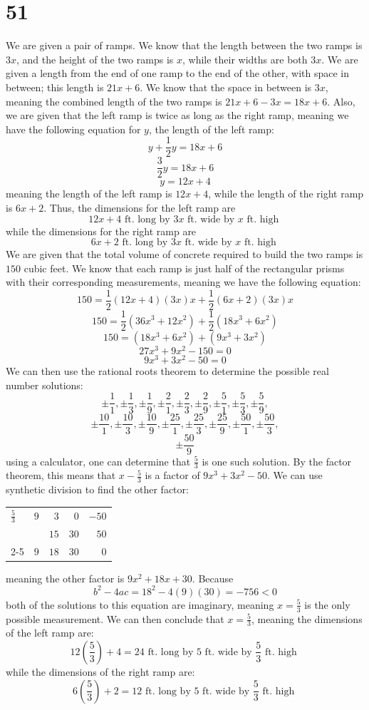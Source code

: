 \documentclass{article}
\theoremstyle{definition}
\begin{document}
\section*{51}
We are given a pair of ramps. We know that the length between the two ramps is $3x$, and the height of the two ramps is $x$, while 
their widths are both $3x$. We are given a length from the end of one ramp to the end of the other, with space in between; this 
length is $21x+6$. We know that 
the space in between is $3x$, meaning the combined length of the two ramps is $21x+6-3x=18x+6$. Also, we are given that the left ramp 
is twice as long as the right ramp, meaning we have the following equation for $y$, the length of the left ramp:
\[ y+\frac{1}{2}y=18x+6 \]
\[ \frac{3}{2}y=18x+6 \]
\[ y=12x+4 \]
meaning the length of the left ramp is $12x+4$, while the length of the right ramp is $6x+2$. Thus, the dimensions for the left ramp are 
\[ 12x+4\textrm{ ft. long by } 3x\textrm{ ft. wide by } x\textrm{ ft. high } \]
while the dimensions for the right ramp are
\[ 6x+2\textrm{ ft. long by } 3x\textrm{ ft. wide by } x\textrm{ ft. high } \]
We are given that the total volume of concrete required to build the two ramps is $150$ cubic feet. We know that each ramp is just half 
of the rectangular prisms with their corresponding measurements, meaning we have the following equation:
\[ 150=\frac{1}{2}(12x+4)(3x)x+\frac{1}{2}(6x+2)(3x)x \]
\[ 150=\frac{1}{2}(36x^3+12x^2)+\frac{1}{2}(18x^3+6x^2) \]
\[ 150=(18x^3+6x^2)+(9x^3+3x^2) \]
\[ 27x^3+9x^2-150=0 \]
\[ 9x^3+3x^2-50=0 \]
We can then use the rational roots theorem to determine the possible real number solutions:
\[ \pm\frac{1}{1},\pm\frac{1}{3},\pm\frac{1}{9},\pm\frac{2}{1},\pm\frac{2}{3},\pm\frac{2}{9},\pm\frac{5}{1},\pm\frac{5}{3},\pm\frac{5}{9}, \]
\[ \pm\frac{10}{1},\pm\frac{10}{3},\pm\frac{10}{9},\pm\frac{25}{1},\pm\frac{25}{3},\pm\frac{25}{9},\pm\frac{50}{1},\pm\frac{50}{3}, \]
\[ \pm\frac{50}{9} \]
using a calculator, one can determine that $\frac{5}{3}$ is one such solution. 
By the factor theorem, this means that $x-\frac{5}{3}$ is a factor of $9x^3+3x^2-50$. We can use synthetic division to find the other factor:
\FloatBarrier
\begin{center}
	\begin{tabular}{l|rrrr}
		$\frac{5}{3}$ & $9$ & $3$ & $0$ & $-50$ \\
		& & $15$ & $30$ & $50$ \\
		\cmidrule{2-5}
		& $9$ & $18$ & $30$ & $0$
	\end{tabular}
\end{center}
\FloatBarrier
meaning the other factor is $9x^2+18x+30$. Because
\[ b^2-4ac=18^2-4(9)(30)=-756<0 \] both of the solutions to this equation are imaginary, meaning $x=\frac{5}{3}$ is the only possible 
measurement. 
We can then conclude that $x=\frac{5}{3}$, meaning 
the dimensions of the left ramp are:
\[ 12(\frac{5}{3})+4=24\textrm{ ft. long by } 5\textrm{ ft. wide by } \frac{5}{3}\textrm{ ft. high } \]
while the dimensions of the right ramp are:
\[ 6(\frac{5}{3})+2=12\textrm{ ft. long by } 5\textrm{ ft. wide by } \frac{5}{3}\textrm{ ft. high } \]
\end{document}
